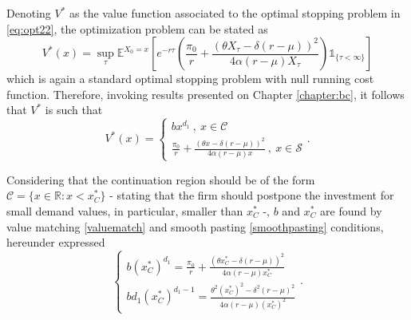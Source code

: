 Denoting $V^*$ as the value function associated to the optimal stopping problem in \eqref{eq:opt22}, the optimization problem can be stated as
\begin{equation}
V^*(x)=\sup _\tau \mathds{E}^{X_0=x} \left[ e^{-r\tau}   \left( \frac{\pi_0}{r} + \frac{(\theta X_\tau -\delta (r-\mu))^2}{4 \alpha (r-\mu) X_\tau} \right) \mathds{1}_{ \{\tau < \infty \} } \right]
\label{2_V*}
\end{equation}
which is again a standard optimal stopping problem with null running cost function. Therefore, invoking results presented on Chapter \ref{chapter:bc}, it follows that $V^*$ is such that
\begin{equation}
V^*(x)=\begin{cases} b x^{d_1}  \ , \ x \in \mathcal{C} \\
\frac{\pi_0}{r}+ \frac{(\theta x -\delta (r-\mu))^2}{4 \alpha (r-\mu) x} \ , \ x \in \mathcal{S}
\end{cases}.
\label{2_V*3}
\end{equation}

Considering that the continuation region should be of the form $\mathcal{C}= \{ x \in \mathds{R}: x< x^*_C \}$ - stating that the firm should postpone the investment for small demand values, in particular, smaller than $x_C^*$ -, $b$ and $x_C^*$ are found by value matching \eqref{valuematch} and smooth pasting \eqref{smoothpasting} conditions, hereunder expressed
\begin{equation}
\begin{cases} b (x_C^*)^{d_1}=\frac{\pi_0}{r} + \frac{(\theta x_C^* -\delta (r-\mu))^2}{4 \alpha (r-\mu) x_C^*}\\
b d_1(x_C^*)^{d_1-1}=\frac{\theta^2 (x_C^*)^2 -\delta^2 (r-\mu)^2}{4 \alpha (r-\mu) (x_C^*)^2}
\end{cases}
.
\label{eq:2_sistema}
\end{equation}

